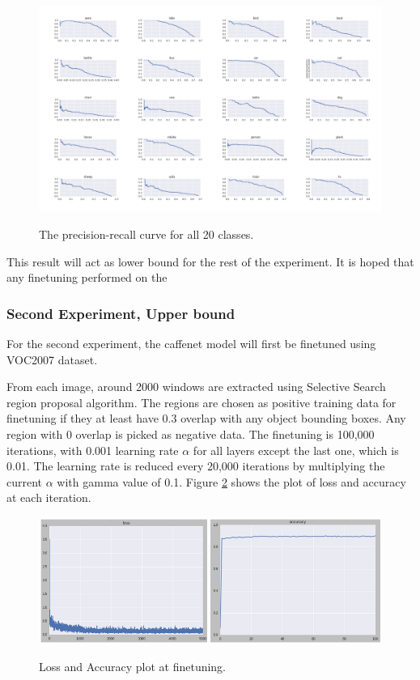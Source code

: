 \documentclass[a4paper,11pt]{kth-mag}
\begin{document}
\begin{figure}[h]
\centering
\includegraphics[scale=0.3]{image/pr_lower.png}
\label{fig:pr_lower}
\caption{The precision-recall curve for all 20 classes.}
\end{figure}

This result will act as lower bound for the rest of the experiment. It is hoped that any finetuning performed on the 

\subsubsection{Second Experiment, Upper bound}
For the second experiment, the caffenet model will first be finetuned using VOC2007 dataset.

From each image, around 2000 windows are extracted using Selective Search region proposal algorithm. The regions are chosen as positive training data for finetuning if they at least have 0.3 overlap with any object bounding boxes. Any region with 0 overlap is picked as negative data. The finetuning is 100,000 iterations, with 0.001 learning rate $\alpha$ for all layers except the last one, which is 0.01. The learning rate is reduced every 20,000 iterations by multiplying the current $\alpha$ with gamma value of 0.1. Figure \ref{fig:finetune_rcnn} shows the plot of loss and accuracy at each iteration.

\begin{figure}
\centering
\includegraphics[scale=0.5]{image/finetune_rcnn.png}
\label{fig:finetune_rcnn}
\caption{Loss and Accuracy plot at finetuning.}
\end{figure}
\end{document}

